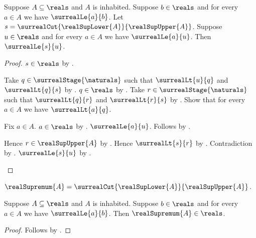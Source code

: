 \begin{theorem}\label{surreal_real_sup_cut_least}
    Suppose $A\subseteq\reals$ and $A$ is inhabited.
    Suppose $b\in\reals$ and for every $a\in A$ we have
        $\surrealLe{a}{b}$.
    Let $s=\surrealCut{\realSupLower{A}}{\realSupUpper{A}}$.
    Suppose $u\in\reals$ and for every $a\in A$ we have
        $\surrealLe{a}{u}$.
    Then $\surrealLe{s}{u}$.
\end{theorem}
\begin{proof}
    $s\in\reals$ by .
    \begin{byCase}
            Take $q\in\surrealStage{\naturals}$ such that
                $\surrealLt{u}{q}$ and $\surrealLt{q}{s}$
                by .
            $q\in\reals$
                by .
            Take $r\in\surrealStage{\naturals}$ such that
                $\surrealLt{q}{r}$ and $\surrealLt{r}{s}$
                by .
            Show that for every $a\in A$ we have $\surrealLt{a}{q}$.
            \begin{subproof}
                Fix $a\in A$.
                $a\in\reals$ by .
                $\surrealLe{a}{u}$.
                Follows by
                    .
            \end{subproof}
            Hence $r\in\realSupUpper{A}$
                by .
            Hence $\surrealLt{s}{r}$
                by
                .
            Contradiction by
                .
            $\surrealLe{s}{u}$
                by
                .
    \end{byCase}
\end{proof}

\begin{definition}\label{real_supremum}
    $\realSupremum{A}=
        \surrealCut{\realSupLower{A}}{\realSupUpper{A}}$.
\end{definition}

\begin{corollary}\label{real_supremum_is_real}
    Suppose $A\subseteq\reals$ and $A$ is inhabited.
    Suppose $b\in\reals$ and for every $a\in A$ we have
        $\surrealLe{a}{b}$.
    Then $\realSupremum{A}\in\reals$.
\end{corollary}
\begin{proof}
    Follows by
        .
\end{proof}

